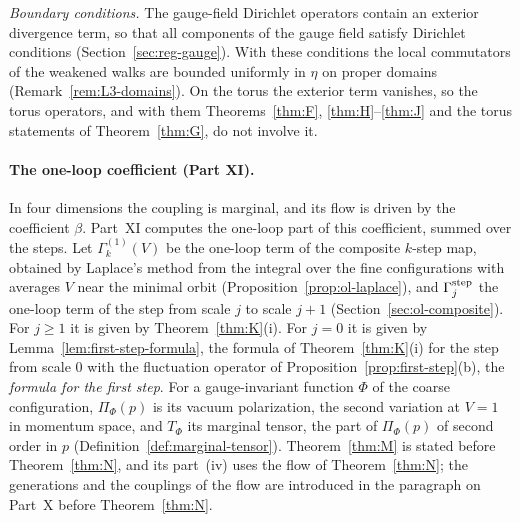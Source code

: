 \emph{Boundary conditions.} The gauge-field Dirichlet operators contain an exterior divergence term, so that all components of the gauge field satisfy Dirichlet conditions (Section~\ref{sec:reg-gauge}). With these conditions the local commutators of the weakened walks are bounded uniformly in $\eta$ on proper domains (Remark~\ref{rem:L3-domains}). On the torus the exterior term vanishes, so the torus operators, and with them Theorems~\ref{thm:F}, \ref{thm:H}--\ref{thm:J} and the torus statements of Theorem~\ref{thm:G}, do not involve it.

\paragraph{The one-loop coefficient (Part XI).} In four dimensions the coupling is marginal, and its flow is driven by the coefficient $\beta$. Part~XI computes the one-loop part of this coefficient, summed over the steps. Let $\Gamma^{(1)}_k(V)$ be the one-loop term of the composite $k$-step map, obtained by Laplace's method from the integral over the fine configurations with averages $V$ near the minimal orbit (Proposition~\ref{prop:ol-laplace}), and $\Gamma^{\rm step}_j$ the one-loop term of the step from scale $j$ to scale $j+1$ (Section~\ref{sec:ol-composite}). For $j\ge1$ it is given by Theorem~\ref{thm:K}(i). For $j=0$ it is given by Lemma~\ref{lem:first-step-formula}, the formula of Theorem~\ref{thm:K}(i) for the step from scale $0$ with the fluctuation operator of Proposition~\ref{prop:first-step}(b), the \emph{formula for the first step}. For a gauge-invariant function $\Phi$ of the coarse configuration, $\Pi_\Phi(p)$ is its vacuum polarization, the second variation at $V=1$ in momentum space, and $T_\Phi$ its marginal tensor, the part of $\Pi_\Phi(p)$ of second order in $p$ (Definition~\ref{def:marginal-tensor}). Theorem~\ref{thm:M} is stated before Theorem~\ref{thm:N}, and its part~(iv) uses the flow of Theorem~\ref{thm:N}; the generations and the couplings of the flow are introduced in the paragraph on Part~X before Theorem~\ref{thm:N}.

